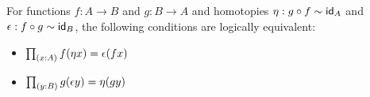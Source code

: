\documentclass[hott-all.tex]{subfiles}
\begin{document}
\begin{lem}\label{lem:coh-equiv}
For functions $f : A \to B$ and $g:B\to A$ and homotopies $\eta: g \circ f \htpy \idfunc[A]$ and $\epsilon:f \circ g \htpy \idfunc[B]$, the following conditions are logically equivalent:
\begin{itemize}
\item $\prd{x:A} \map{f}{\eta x} = \epsilon(fx)$
\item $\prd{y:B} \map{g}{\epsilon y} = \eta(gy)$
\end{itemize}
\end{lem}

%
\end{document}
